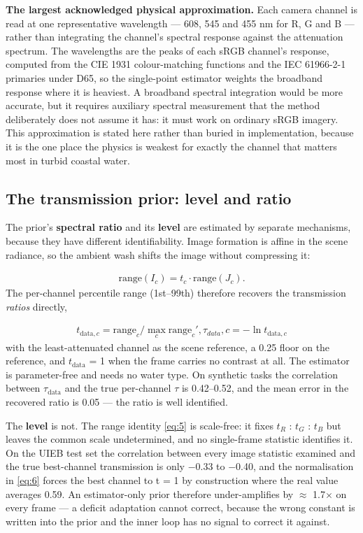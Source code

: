 \documentclass[journal]{IEEEtran}
\begin{document}
\textbf{The largest acknowledged physical approximation.} Each camera channel is read at one representative wavelength --- 608, 545 and 455 nm for R, G and B --- rather than integrating the channel's spectral response against the attenuation spectrum. The wavelengths are the peaks of each sRGB channel's response, computed from the CIE 1931 colour-matching functions and the IEC 61966-2-1 primaries under D65, so the single-point estimator weights the broadband response where it is heaviest. A broadband spectral integration would be more accurate, but it requires auxiliary spectral measurement that the method deliberately does not assume it has: it must work on ordinary sRGB imagery. This approximation is stated here rather than buried in implementation, because it is the one place the physics is weakest for exactly the channel that matters most in turbid coastal water.

\subsection{The transmission prior: level and ratio}
The prior's \textbf{spectral ratio} and its \textbf{level} are estimated by separate mechanisms, because they have different identifiability. Image formation is affine in the scene radiance, so the ambient wash shifts the image without compressing it:

\begin{align}
\mathrm{range}(I_{c}) = t_{c} \cdot  \mathrm{range}(J_{c}).\label{eq:5} 
\end{align}
The per-channel percentile range (1st--99th) therefore recovers the transmission \emph{ratios} directly,

\begin{align}
t_{\mathrm{data},c} = \mathrm{range}_{c} / \max_{c} \mathrm{range}_{c}',      \tau _{data},c = -\ln t_{\mathrm{data},c}\label{eq:6} 
\end{align}
with the least-attenuated channel as the scene reference, a 0.25 floor on the reference, and $t_{\mathrm{data}}$ = 1 when the frame carries no contrast at all. The estimator is parameter-free and needs no water type. On synthetic tasks the correlation between $\tau_{\mathrm{data}}$ and the true per-channel $\tau$ is 0.42--0.52, and the mean error in the recovered ratio is 0.05 --- the ratio is well identified.

The \textbf{level} is not. The range identity \eqref{eq:5} is scale-free: it fixes $t_{R}$ : $t_{G}$ : $t_{B}$ but leaves the common scale undetermined, and no single-frame statistic identifies it. On the UIEB test set the correlation between every image statistic examined and the true best-channel transmission is only $-$0.33 to $-$0.40, and the normalisation in \eqref{eq:6} forces the best channel to t = 1 by construction where the real value averages 0.59. An estimator-only prior therefore under-amplifies by $\approx$ 1.7$\times$ on every frame --- a deficit adaptation cannot correct, because the wrong constant is written into the prior and the inner loop has no signal to correct it against.
\end{document}
